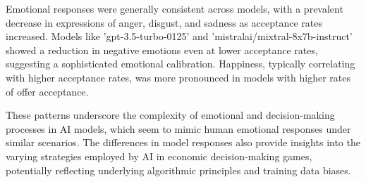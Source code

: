\documentclass{article}
\begin{document}
Emotional responses were generally consistent across models, with a prevalent decrease in expressions of anger, disgust, and sadness as acceptance rates increased. Models like 'gpt-3.5-turbo-0125' and 'mistralai/mixtral-8x7b-instruct' showed a reduction in negative emotions even at lower acceptance rates, suggesting a sophisticated emotional calibration. Happiness, typically correlating with higher acceptance rates, was more pronounced in models with higher rates of offer acceptance.

These patterns underscore the complexity of emotional and decision-making processes in AI models, which seem to mimic human emotional responses under similar scenarios. The differences in model responses also provide insights into the varying strategies employed by AI in economic decision-making games, potentially reflecting underlying algorithmic principles and training data biases.



\end{document}
